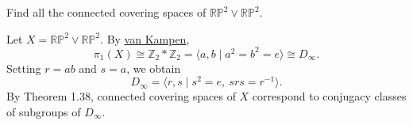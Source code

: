 	\begin{exercise}[Hatcher 1.3.14]
		Find all the connected covering spaces of $\mathbb{RP}^2 \vee \mathbb{RP}^2$.
	\end{exercise}
	\begin{solution}
		Let $X = \mathbb{RP}^2 \vee \mathbb{RP}^2$. By \hyperref[thm:van-kampen-theorem]{van Kampen},
		\begin{equation}
			\pi_1(X) \cong \mathbb{Z}_2 * \mathbb{Z}_2
			= \langle a,b \mid a^2 = b^2 = e \rangle
			\cong D_\infty.
		\end{equation}
		Setting $r = ab$ and $s = a$, we obtain
		\begin{equation}
			D_\infty = \langle r,s \mid s^2 = e,\ srs = r^{-1} \rangle.
		\end{equation}
		By Theorem 1.38, connected covering spaces of $X$ correspond
		to conjugacy classes of subgroups of $D_\infty$.


\end{solution}
